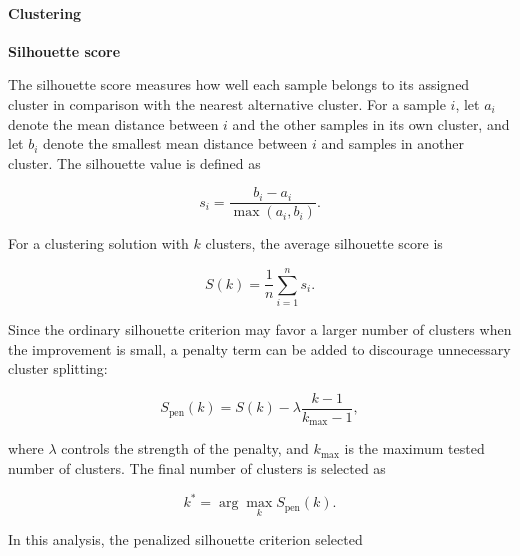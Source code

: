 \documentclass{book}
\providecommand{\ProjectDeepHeading}[2]{%
    \par\medskip\noindent\textbf{#2}\par\smallskip
}
\begin{document}

% 

\paragraph{Clustering}


\ProjectDeepHeading{2}{Silhouette score}
        The silhouette score \cite{rousseeuw-1987-silhouettes-a-graphical-aid-to-the-interpretation-and-validation-of-cluster-analysis} measures how well each sample belongs to its assigned cluster in comparison with the nearest alternative cluster. For a sample \(i\), let \(a_i\) denote the mean distance between \(i\) and the other samples in its own cluster, and let \(b_i\) denote the smallest mean distance between \(i\) and samples in another cluster. The silhouette value is defined as
        
        \[
            s_i
            =
            \frac{b_i - a_i}{\max(a_i, b_i)}.
        \]
        
        For a clustering solution with \(k\) clusters, the average silhouette score is
        
        \[
            S(k)
            =
            \frac{1}{n}
            \sum_{i=1}^{n}
            s_i.
        \]
        
        Since the ordinary silhouette criterion may favor a larger number of clusters when the improvement is small, a penalty term can be added to discourage unnecessary cluster splitting:
        
        \[
            S_{\mathrm{pen}}(k)
            =
            S(k)
            -
            \ensuremath{\lambda}
            \frac{k - 1}{k_{\max} - 1},
        \]
        
        where \(\ensuremath{\lambda}\) controls the strength of the penalty, and \(k_{\max}\) is the maximum tested number of clusters. The final number of clusters is selected as
        
        \[
            k^{\ast}
            =
            \arg\max_{k}
            S_{\mathrm{pen}}(k).
        \]
        
        In this analysis, the penalized silhouette criterion selected
        
\end{document}
